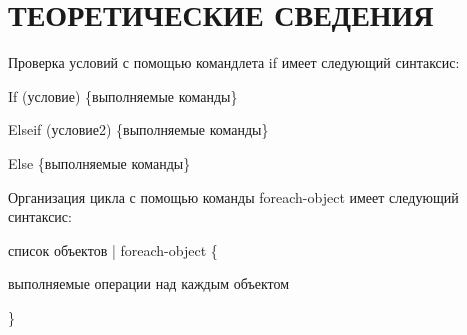 \section{ТЕОРЕТИЧЕСКИЕ СВЕДЕНИЯ}

Проверка условий с помощью командлета if имеет следующий синтаксис:

If (условие) \{выполняемые команды\}

Elseif (условие2) \{выполняемые команды\}

Else \{выполняемые команды\}

Организация цикла с помощью команды foreach-object имеет следующий синтаксис:

список объектов | foreach-object \{

    \hspace{7mm} выполняемые операции над каждым объектом

\}

\newpage

